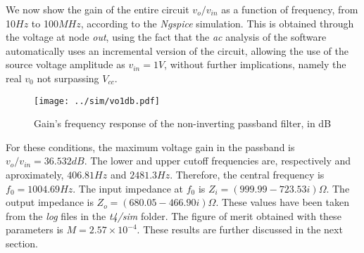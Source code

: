 \par We now show the gain of the entire circuit $v_o / v_{in}$ as a function of frequency, from 10$Hz$ to 100$MHz$, according to the \textit{Ngspice} simulation. This is obtained through the voltage at node \textit{out}, using the fact that the \textit{ac} analysis of the software automatically uses an incremental version of the circuit, allowing the use of the source voltage amplitude as $v_{in} = 1V$, without further implications, namely the real $v_0$ not surpassing $V_{cc}$.

 \vspace{-2cm}
 \begin{figure}[H]
 \centering
   \texttt{[image: ../sim/vo1db.pdf]}
   \caption{Gain's frequency response of the non-inverting passband filter, in dB}
   \label{fig:gain(freq)}
 \end{figure}

\par For these conditions, the maximum voltage gain in the passband is $v_o/v_{in} = 36.532 dB$. The lower and upper cutoff frequencies are, respectively and aproximately, $406.81 Hz$ and $2481.3 Hz$. Therefore, the central frequency is $f_0 = 1004.69 Hz$. The input impedance at $f_0$ is $Z_i = (999.99 - 723.53 i) \Omega$. The output impedance is $Z_o = (680.05 - 466.90 i) \Omega$. These values have been taken from the \textit{log} files in the \textit{t4/sim} folder. The figure of merit obtained with these parameters is $M = 2.57 \times 10^{-4}$. These results are further discussed in the next section.

